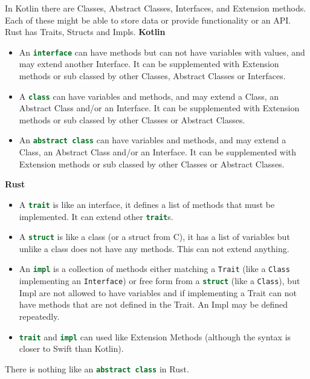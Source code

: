 \documentclass[a4paper,11pt]{article}
\begin{document}
In Kotlin there are Classes, Abstract Classes, Interfaces, and Extension methods. Each of these might be able to store data or provide functionality or an API.
Rust has Traits, Structs and Impls.
\newline
\textbf{Kotlin}
\begin{itemize}
  \item An \lstinline[language=Kotlin]{interface} can have methods but can not have variables with values, and may extend another Interface. It can be supplemented with Extension methods or sub classed by other Classes, Abstract Classes or Interfaces.
  \item A \lstinline[language=Kotlin]{class} can have variables and methods, and may extend a Class, an Abstract Class and/or an Interface. It can be supplemented with Extension methods or sub classed by other Classes or Abstract Classes.
  \item An \lstinline[language=Kotlin]{abstract class} can have variables and methods, and may extend a Class, an Abstract Class and/or an Interface. It can be supplemented with Extension methods or sub classed by other Classes or Abstract Classes.
\end{itemize}
\textbf{Rust}
\begin{itemize}
  \item A \lstinline[language=Rust]{trait} is like an interface, it defines a list of methods that must be implemented. It can extend other \lstinline[language=Rust]{trait}s.
  \item A \lstinline[language=Rust]{struct} is like a class (or a struct from C), it has a list of variables but unlike a class does not have any methods. This can not extend anything.
  \item An \lstinline[language=Rust]{impl} is a collection of methods either matching a \lstinline[language=Rust]{Trait} (like a \lstinline[language=Kotlin]{Class} implementing an \lstinline[language=Kotlin]{Interface}) or free form from a \lstinline[language=Rust]{struct} (like a \lstinline[language=Kotlin]{Class}), but Impl are not allowed to have variables and if implementing a Trait can not have methods that are not defined in the Trait. An Impl may be defined repeatedly.
  \item \lstinline[language=Rust]{trait} and \lstinline[language=Rust]{impl} can used like Extension Methods (although the syntax is closer to Swift than Kotlin).
\end{itemize}

There is nothing like an \lstinline[language=Kotlin]{abstract class} in Rust.
\end{document}
